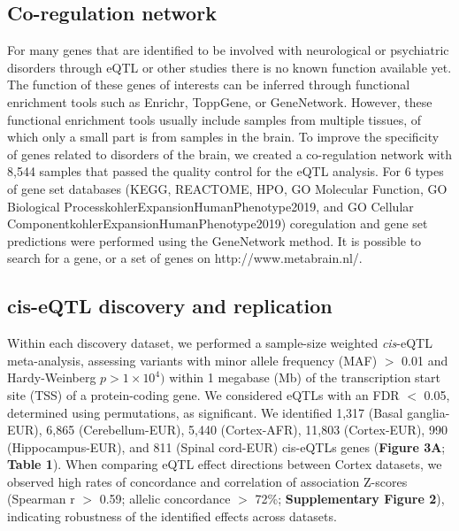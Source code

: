 \subsection{Co-regulation network }
For many genes that are identified to be involved with neurological or psychiatric disorders through eQTL or other studies there is no known function available yet. The function of these genes of interests can be inferred through functional enrichment tools such as Enrichr\cite{chenEnrichrInteractiveCollaborative2013,EnrichrComprehensiveGene}, ToppGene\cite{chenToppGeneSuiteGene2009}, or GeneNetwork\cite{deelenImprovingDiagnosticYield2019}. However, these functional enrichment tools usually include samples from multiple tissues, of which only a small part is from samples in the brain. To improve the specificity of genes related to disorders of the brain, we created a co-regulation network with 8,544 samples that passed the quality control for the eQTL analysis. For 6 types of gene set databases (KEGG\cite{kanehisaKEGGKyotoEncyclopedia2000}, REACTOME\cite{jassalReactomePathwayKnowledgebase2020}, HPO\cite{kohlerExpansionHumanPhenotype2019}, GO Molecular Function\cite{kohlerExpansionHumanPhenotype2019}, GO Biological ProcesskohlerExpansionHumanPhenotype2019, and GO Cellular ComponentkohlerExpansionHumanPhenotype2019) coregulation and gene set predictions were performed using the GeneNetwork method\cite{deelenImprovingDiagnosticYield2019}. It is possible to search for a gene, or a set of genes on http://www.metabrain.nl/. 

\subsection{cis-eQTL discovery and replication }
Within each discovery dataset, we performed a sample-size weighted \emph{cis}-eQTL meta-analysis, assessing variants with minor allele frequency (MAF) $>$ 0.01 and Hardy-Weinberg $p > 1 \times 10^{4})$ within 1 megabase (Mb) of the transcription start site (TSS) of a protein-coding gene. We considered eQTLs with an FDR $<$ 0.05, determined using permutations, as significant. We identified 1,317 (Basal ganglia-EUR), 6,865 (Cerebellum-EUR), 5,440 (Cortex-AFR), 11,803 (Cortex-EUR), 990 (Hippocampus-EUR), and 811 (Spinal cord-EUR) cis-eQTLs genes (\textbf{Figure 3A}; \textbf{Table 1}). When comparing eQTL effect directions between Cortex datasets, we observed high rates of concordance and correlation of association Z-scores (Spearman r $>$ 0.59; allelic concordance $>$ 72\%; \textbf{Supplementary Figure 2}), indicating robustness of the identified effects across datasets.  

